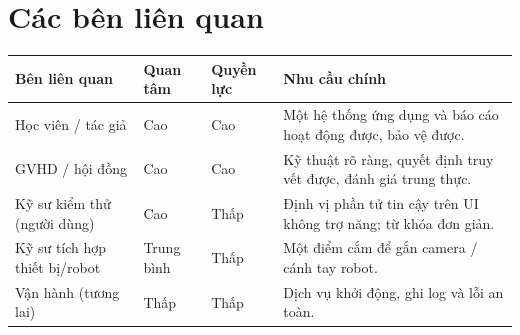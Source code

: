 \documentclass[11pt,a4paper]{report}
\begin{document}
\section{Các bên liên quan}
\begin{longtable}{@{}p{3.4cm}p{2.2cm}p{2.0cm}p{6.0cm}@{}}
\toprule
\textbf{Bên liên quan} & \textbf{Quan tâm} & \textbf{Quyền lực} & \textbf{Nhu cầu chính} \\
\midrule
\endhead
Học viên / tác giả & Cao & Cao & Một hệ thống ứng dụng và báo cáo hoạt động được, bảo vệ được. \\
GVHD / hội đồng & Cao & Cao & Kỹ thuật rõ ràng, quyết định truy vết được, đánh giá trung thực. \\
Kỹ sư kiểm thử (người dùng) & Cao & Thấp & Định vị phần tử tin cậy trên UI không trợ năng; từ khóa đơn giản. \\
Kỹ sư tích hợp thiết bị/robot & Trung bình & Thấp & Một điểm cắm để gắn camera / cánh tay robot. \\
Vận hành (tương lai) & Thấp & Thấp & Dịch vụ khởi động, ghi log và lỗi an toàn. \\
\bottomrule
\end{longtable}

\end{document}
